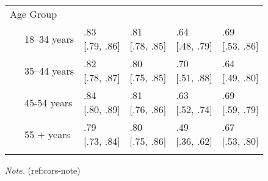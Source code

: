 \documentclass[
  english,
  man]{apa6}
\begin{document}
\begin{table}[tbp]
\begin{center}
\begin{threeparttable}
\begin{tabular}{lllll}
Age Group &  &  &  & \\
\ \ \ 18–34 years & \makecell[c]{.83 \\ {[}.79, .86{]}} & \makecell[c]{.81 \\ {[}.78, .85{]}} & \makecell[c]{.64 \\  {[}.48, .79{]}} & \makecell[c]{.69 \\ {[}.53, .86{]}}\\
\ \ \ 35–44 years & \makecell[c]{.82 \\ {[}.78, .87{]}} & \makecell[c]{.80 \\ {[}.75, .85{]}} & \makecell[c]{.70 \\  {[}.51, .88{]}} & \makecell[c]{.64 \\ {[}.49, .80{]}}\\
\ \ \ 45-54 years & \makecell[c]{.84 \\ {[}.80, .89{]}} & \makecell[c]{.81 \\ {[}.76, .86{]}} & \makecell[c]{.63 \\  {[}.52, .74{]}} & \makecell[c]{.69 \\ {[}.59, .79{]}}\\
\ \ \ 55 + years & \makecell[c]{.79 \\ {[}.73, .84{]}} & \makecell[c]{.80 \\ {[}.75, .86{]}} & \makecell[c]{.49 \\  {[}.36, .62{]}} & \makecell[c]{.67 \\ {[}.53, .80{]}}\\
\bottomrule
\addlinespace
\end{tabular}

\begin{tablenotes}[para]
\normalsize{\textit{Note.} (ref:cors-note)}
\end{tablenotes}

\end{threeparttable}
\end{center}

\end{table}
\newpage
\end{document}
